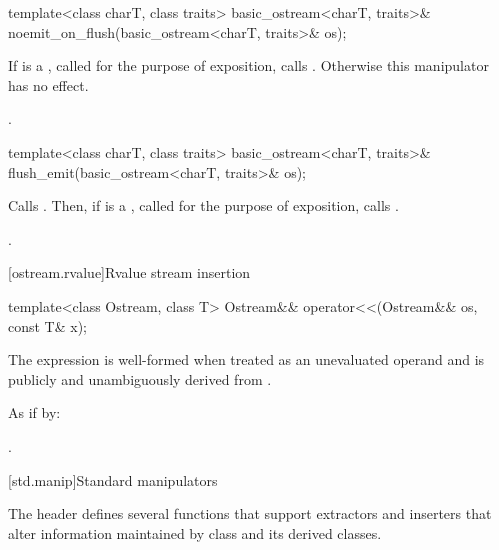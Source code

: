 %
\begin{itemdecl}
template<class charT, class traits>
  basic_ostream<charT, traits>& noemit_on_flush(basic_ostream<charT, traits>& os);
\end{itemdecl}

\begin{itemdescr}
\pnum
\effects
If  is a
,
called  for the purpose of exposition,
calls .
Otherwise this manipulator has no effect.

\pnum
\returns
{}.
\end{itemdescr}

%
\begin{itemdecl}
template<class charT, class traits>
  basic_ostream<charT, traits>& flush_emit(basic_ostream<charT, traits>& os);
\end{itemdecl}

\begin{itemdescr}
\pnum
\effects
Calls .
Then, if  is a
,
called  for the purpose of exposition,
calls .

\pnum
\returns
{}.
\end{itemdescr}

[ostream.rvalue]{Rvalue stream insertion}

%
\begin{itemdecl}
template<class Ostream, class T>
  Ostream&& operator<<(Ostream&& os, const T& x);
\end{itemdecl}

\begin{itemdescr}
\pnum
\constraints
The expression  is well-formed
when treated as an unevaluated operand and
 is publicly and unambiguously derived from .

\pnum
\effects
As if by: 

\pnum
\returns
{}.
\end{itemdescr}


[std.manip]{Standard manipulators}

\pnum
The header  defines several functions that support
extractors and inserters that alter information maintained by class
 and its derived classes.

